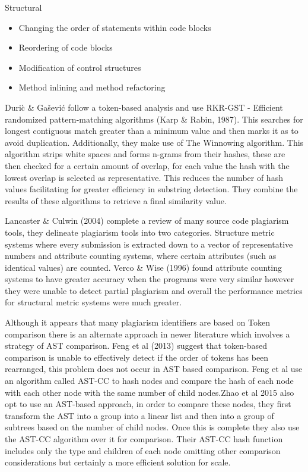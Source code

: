 \documentclass[jou,apacite]{apa6}
\begin{document}
Structural
\begin{itemize}
  \setlength\itemsep{-0.5em}
  \item Changing the order of statements within code blocks
  \item Reordering of code blocks
  \item Modification of control structures
  \item Method inlining and method refactoring
\end{itemize}

Duri\`c \& Gašević follow a token-based analysis and use RKR-GST - Efficient randomized pattern-matching algorithms (Karp \& Rabin, 1987). This searches for longest contiguous match greater than a minimum value and then marks it as to avoid duplication. Additionally, they make use of The Winnowing algorithm. 
This algorithm strips white spaces and forms n-grams from their hashes, these are then checked for a certain amount of overlap, for each value the hash with the lowest overlap is selected as representative. This reduces the number of hash values facilitating for greater efficiency in substring detection. They combine the results of these algorithms to retrieve a final similarity value.

Lancaster \& Culwin (2004) complete a review of many source code plagiarism tools, they delineate plagiarism tools into two categories. Structure metric systems where every submission is extracted down to a vector of representative numbers and attribute counting systems, where certain attributes (such as identical values) are counted. Verco \& Wise (1996) found attribute counting systems to have greater accuracy when the programs were very similar however they were unable to detect partial plagiarism and overall the performance metrics for structural metric systems were much greater. 

Although it appears that many plagiarism identifiers are based on Token comparison there is an alternate approach in newer literature which involves a strategy of AST comparison. Feng et al (2013) suggest that token-based comparison is unable to effectively detect if the order of tokens has been rearranged, this problem does not occur in AST based comparison. Feng et al use an algorithm called AST-CC to hash nodes and compare the hash of each node with each other node with the same number of child nodes.Zhao et al 2015 also opt to use an AST-based approach, in order to compare these nodes, they first transform the AST into a group into a linear list and then into a group of subtrees based on the number of child nodes. Once this is complete they also use the AST-CC algorithm over it for comparison. Their AST-CC hash function includes only the type and children of each node omitting other comparison considerations but certainly a more efficient solution for scale.
\end{document}
